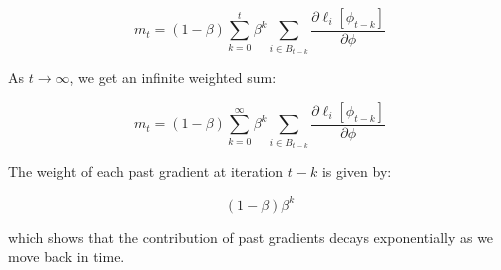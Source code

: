 \documentclass[10pt]{article}
\begin{document}
\begin{equation}
    m_t = (1 - \beta) \sum_{k=0}^{t} \beta^k \sum_{i \in B_{t-k}} \frac{\partial \ell_i [\phi_{t-k}]}{\partial \phi}
\end{equation}


As \( t \to \infty \), we get an infinite weighted sum:

\begin{equation}
    m_t = (1 - \beta) \sum_{k=0}^{\infty} \beta^k \sum_{i \in B_{t-k}} \frac{\partial \ell_i [\phi_{t-k}]}{\partial \phi}
\end{equation}


The weight of each past gradient at iteration \( t-k \) is given by:

\begin{equation}
    (1 - \beta) \beta^k
\end{equation}

which shows that the contribution of past gradients decays exponentially as we move back in time.
\end{document}
